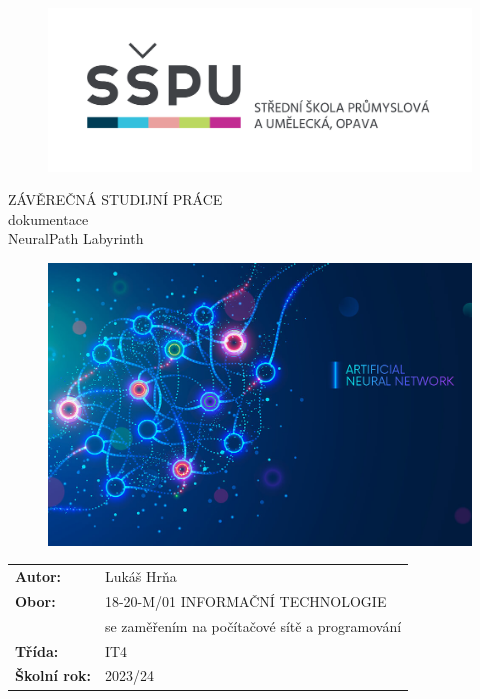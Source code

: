 \documentclass[12pt, a4paper,
twoside,        %
openright
]{report}
\title{\nazevPrace} %
\author{\jmenoAutora} %
\date{\datumOdevzdani} %
\newcommand\obor{INFORMAČNÍ TECHNOLOGIE} %
\newcommand\kodOboru{18-20-M/01} %
\newcommand\zamereni{se zaměřením na počítačové sítě a programování} %
\newcommand\trida{IT4} %
\newcommand\jmenoAutora{Lukáš Hrňa}  %
\newcommand\skolniRok{2023/24} %
\newcommand\nazevPrace{NeuralPath Labyrinth} %
\begin{document}
	
	\pagestyle{fancy}
	
	\cleardoublepage

	
	{\selectfont
		\begin{figure}[h]
			\centering
			\includegraphics[width=0.6\linewidth]{image/logo-skoly.png} 
		\end{figure}
		
		
		{\bfseries %
			\begin{center}
				\vspace{0.025 \textheight}
				\LARGE{ZÁVĚREČNÁ STUDIJNÍ PRÁCE}\\
				\large{dokumentace}\\
				\vspace{0.075 \textheight}
				\LARGE {\nazevPrace}\\
			\end{center}  
		}%
		
		\begin{figure}[h]
			\centering
			\includegraphics[width=0.7\linewidth]{image/programovani-02.jpeg} 
		\end{figure}
		
		\vspace{0.02 \textheight}
		\begin{table}[h!]
			\begin{tabular}{ll}
				\textbf{Autor:} & \jmenoAutora\\ 
				\textbf{Obor:} & \kodOboru { } \obor\\
				\textbf{} & \zamereni\\
				\textbf{Třída:} & \trida\\
				\textbf{Školní rok:} & \skolniRok\\
			\end{tabular}
			
		\end{table}		
	}
	
\end{document}
